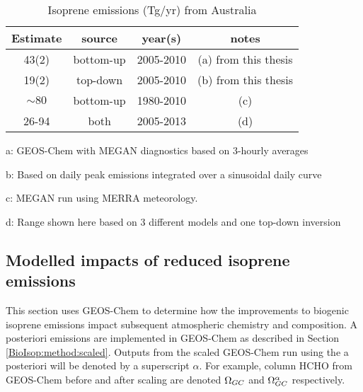     \begin{table}\begin{threeparttable}
      \caption{Isoprene emissions (Tg/yr) from Australia}
      \begin{tabular}{ c c c c } 
        \toprule
        Estimate & source & year(s) & notes \\
        \midrule
        43(2) & bottom-up & 2005-2010 & (a) from this thesis \\ %
        19(2) & top-down & 2005-2010 & (b) from this thesis \\
        $\sim 80$ & bottom-up & 1980-2010 & (c) \textcite{Sindelarova2014} \\ %
        26-94 & both & 2005-2013 & (d) \textcite{Bauwens2016} \\
        
        \bottomrule
      \end{tabular}
      \begin{tablenotes} 
        \item a: GEOS-Chem with MEGAN diagnostics based on 3-hourly averages
        \item b: Based on daily peak emissions integrated over a sinusoidal daily curve
        \item c: MEGAN run using MERRA meteorology.  
        \item d: Range shown here based on 3 different models and one top-down inversion
      \end{tablenotes}
      \label{BioIsop:results:emissions:tab_emissions_Tg}
    \end{threeparttable}\end{table}
    
  \subsection{Modelled impacts of reduced isoprene emissions}
  \label{BioIsop:results:new_emiss}
    
    This section uses GEOS-Chem to determine how the improvements to biogenic isoprene emissions impact subsequent atmospheric chemistry and composition.
    A posteriori emissions are implemented in GEOS-Chem as described in Section \ref{BioIsop:method:scaled}.
    Outputs from the scaled GEOS-Chem run using the a posteriori will be denoted by a superscript $\alpha$.
    For example, column HCHO from GEOS-Chem before and after scaling are denoted $\Omega_{GC}$ and $\Omega_{GC}^{\alpha}$ respectively.
    
